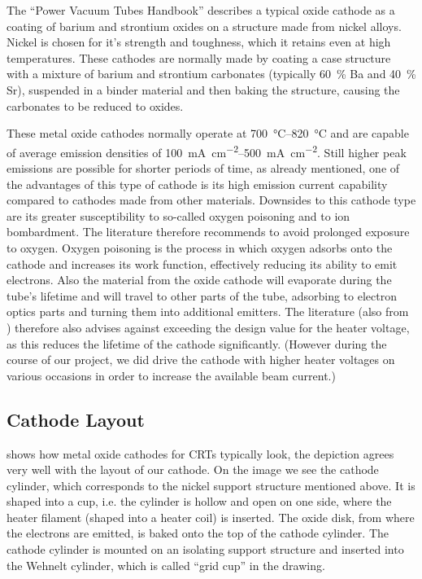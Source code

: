 The ``Power Vacuum Tubes Handbook'' \cite[chp 3.5.2.1]{Whitaker} describes a typical oxide cathode as a coating of barium and strontium oxides on a structure made from nickel alloys. Nickel is chosen for it's strength and toughness, which it retains even at high temperatures. These cathodes are normally made by coating a case structure with a mixture of barium and strontium carbonates (typically \SI{60}{\percent} Ba and \SI{40}{\percent} Sr), suspended in a binder material and then baking the structure, causing the carbonates to be reduced to oxides.

These metal oxide cathodes normally operate at \SIrange{700}{820}{\celsius} and are capable of average emission densities of \SIrange{100}{500}{\milli\ampere\per\centi\meter\squared}. Still higher peak emissions are possible for shorter periods of time, as already mentioned, one of the advantages of this type of cathode is its high emission current capability compared to cathodes made from other materials. Downsides to this cathode type are its greater susceptibility to so-called oxygen poisoning and to ion bombardment. The literature therefore recommends to avoid prolonged exposure to oxygen. Oxygen poisoning is the process in which oxygen adsorbs onto the cathode and increases its work function, effectively reducing its ability to emit electrons. 
Also the material from the oxide cathode will evaporate during the tube's lifetime and will travel to other parts of the tube, adsorbing to electron optics parts and turning them into additional emitters. The literature (also from \cite{PowerTubes323Avadhanulu}) therefore also advises against exceeding the design value for the heater voltage, as this reduces the lifetime of the cathode significantly. (However during the course of our project, we did drive the cathode with higher heater voltages on various occasions in order to increase the available beam current.)

\subsection{Cathode Layout}

 shows how metal oxide cathodes for CRTs typically look, the depiction agrees very well with the layout of our cathode. On the image we see the cathode cylinder, which corresponds to the nickel support structure mentioned above. It is shaped into a cup, i.e. the cylinder is hollow and open on one side, where the heater filament (shaped into a heater coil) is inserted. The oxide disk, from where the electrons are emitted, is baked onto the top of the cathode cylinder. The cathode cylinder is mounted on an isolating support structure and inserted into the Wehnelt cylinder, which is called ``grid cup'' in the drawing. 
  

